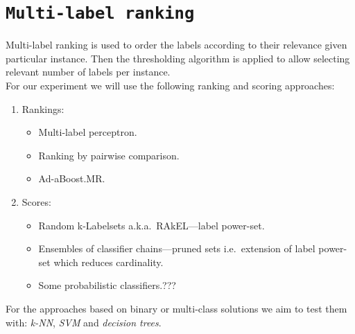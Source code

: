 \documentclass[12pt,a4paper,twocolumn]{article}
\begin{document}
\section*{\texttt{Multi-label ranking}}
Multi-label ranking is used to order the labels according to their relevance given particular instance. Then the thresholding algorithm is applied to allow selecting relevant number of labels per instance.\\
For our experiment we will use the following ranking and scoring approaches:
\begin{enumerate}
\item Rankings:
	\begin{itemize}
	\item Multi-label perceptron. %
	\item Ranking by pairwise comparison. %
	\item Ad-aBoost.MR. %
	\end{itemize}
\item Scores:
	\begin{itemize}
	\item Random k-Labelsets a.k.a.\ RAkEL---label power-set. %
	\item Ensembles of classifier chains---pruned sets i.e.\ extension of label power-set which reduces cardinality. %
	\item Some probabilistic classifiers.???
	\end{itemize}
\end{enumerate}

For the approaches based on binary or multi-class solutions we aim to test them with: \emph{k-NN}, \emph{SVM} and \emph{decision trees}.
\end{document}
